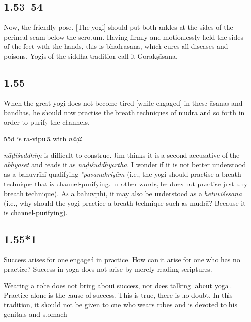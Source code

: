 \begin{ekdosis}
\subsection*{1.53--54}
\begin{translation}[hp01_053]
Now, the friendly pose.
[The yogi] should put both ankles at the sides of the perineal seam below the scrotum.  Having firmly and motionlessly held the sides of the feet with the hands, this is bhadrāsana, which cures all diseases and poisons. Yogis of the siddha tradition call it Gorakṣāsana. 
\end{translation}

\subsection*{1.55}
\begin{translation}[hp01_055]
When the great yogi does not become tired [while engaged] in these āsanas and bandhas, he should now practise the breath techniques of mudrā and so forth in order to purify the channels.
\end{translation}

\begin{philcomm}[hp01_055]
55d is ra-vipulā with \emph{nāḍi}

\emph{nāḍiśuddhiṃ} is difficult to construe. Jim thinks it is a second accusative of the \emph{abhyaset} and reads it as \emph{nāḍiśuddhyartha}. I wonder if it is not better understood as a bahuvrīhī qualifying \emph{°pavanakriyām} (i.e., the yogi should practise a breath technique that is channel-purifying. In other words, he does not practise just any breath technique). As a bahuvṛīhi, it may also be understood as a \emph{hetuviśeṣaṇa} (i.e., why should the yogi practice a breath-technique such as mudrā? Because it is channel-purifying).
\end{philcomm}

\subsection*{1.55*1}
\begin{translation}[hp01_055_1]
Success arises for one engaged in practice. How can it arise for one who has no practice? Success in yoga does not arise by merely reading scriptures.

Wearing a robe does not bring about success, nor does talking [about yoga]. Practice alone is the cause of success. This is true, there is no doubt. In this tradition, it should not be given to one who wears robes and is devoted to his genitals and stomach.
\end{translation}


\end{ekdosis}
